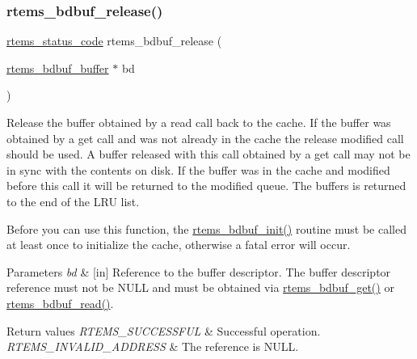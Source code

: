 \subsubsection{\texorpdfstring{rtems\_bdbuf\_release()}{rtems\_bdbuf\_release()}}
{\footnotesize\ttfamily \mbox{\hyperlink{group__ClassicStatus_ga545d41846817eaba6143d52ee4d9e9fe}{rtems\+\_\+status\+\_\+code}} rtems\+\_\+bdbuf\+\_\+release (\begin{DoxyParamCaption}\item[{\mbox{\hyperlink{structrtems__bdbuf__buffer}{rtems\+\_\+bdbuf\+\_\+buffer}} $\ast$}]{bd }\end{DoxyParamCaption})}

Release the buffer obtained by a read call back to the cache. If the buffer was obtained by a get call and was not already in the cache the release modified call should be used. A buffer released with this call obtained by a get call may not be in sync with the contents on disk. If the buffer was in the cache and modified before this call it will be returned to the modified queue. The buffers is returned to the end of the L\+RU list.

Before you can use this function, the \mbox{\hyperlink{group__rtems__bdbuf_gaf19ee8ba7815e24767b6a91e200a78bc}{rtems\+\_\+bdbuf\+\_\+init()}} routine must be called at least once to initialize the cache, otherwise a fatal error will occur.


\begin{DoxyParams}{Parameters}
{\em bd} & \mbox{[}in\mbox{]} Reference to the buffer descriptor. The buffer descriptor reference must not be {\ttfamily N\+U\+LL} and must be obtained via \mbox{\hyperlink{group__rtems__bdbuf_ga05fa34cc25ade6d09797b0dc88cf33e1}{rtems\+\_\+bdbuf\+\_\+get()}} or \mbox{\hyperlink{group__rtems__bdbuf_ga8546cefc842eef10cdb5b38a6cead9f7}{rtems\+\_\+bdbuf\+\_\+read()}}.\\
\hline
\end{DoxyParams}

\begin{DoxyRetVals}{Return values}
{\em R\+T\+E\+M\+S\+\_\+\+S\+U\+C\+C\+E\+S\+S\+F\+UL} & Successful operation. \\
\hline
{\em R\+T\+E\+M\+S\+\_\+\+I\+N\+V\+A\+L\+I\+D\+\_\+\+A\+D\+D\+R\+E\+SS} & The reference is N\+U\+LL. \\
\hline
\end{DoxyRetVals}
\mbox{\label{group__rtems__bdbuf_ga3f8af85cf0abcb0858811f74130aa6c7}} 
